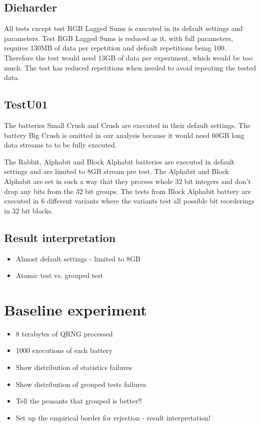 \documentclass[
  digital,  	%
  color,		%
  oneside,   	%
  12pt,
  nocover,
  notable,
  nolof,
  nolot,
]{fithesis3}
\begin{document}
\subsection*{Dieharder}
All tests except test RGB Lagged Sums is executed in its default settings and parameters. Test RGB Lagged Sums is reduced as it, with full parameters, requires 130MB of data per repetition and default repetitions being 100. Therefore the test would need 13GB of data per experiment, which would be too much. The test has reduced repetitions when needed to avoid repeating the tested data.

\subsection*{TestU01}
The batteries Small Crush and Crush are executed in their default settings. The battery Big Crush is omitted in our analysis because it would need 60GB long data streams to to be fully executed.

The Rabbit, Alphabit and Block Alphabit batteries are executed in default settings and are limited to 8GB stream pre test. The Alphabit and Block Alphabit are set in such a way that they process whole 32 bit integers and don't drop any bits from the 32 bit groups. The tests from Block Alphabit battery are executed in 6 different variants where the variants test all possible bit reorderings in 32 bit blocks. 

\subsection{Result interpretation}

\begin{itemize}
\item Almost default settings - limited to 8GB
\item Atomic test vs. grouped test
\end{itemize}

\section{Baseline experiment}
\begin{itemize}
\item 8 terabytes of QRNG processed
\item 1000 executions of each battery
\item Show distribution of statistics failures
\item Show distribution of grouped tests failures
\item Tell the peasants that grouped is better!!
\item Set up the empirical border for rejection - result interpretation!
\end{itemize}
\end{document}
